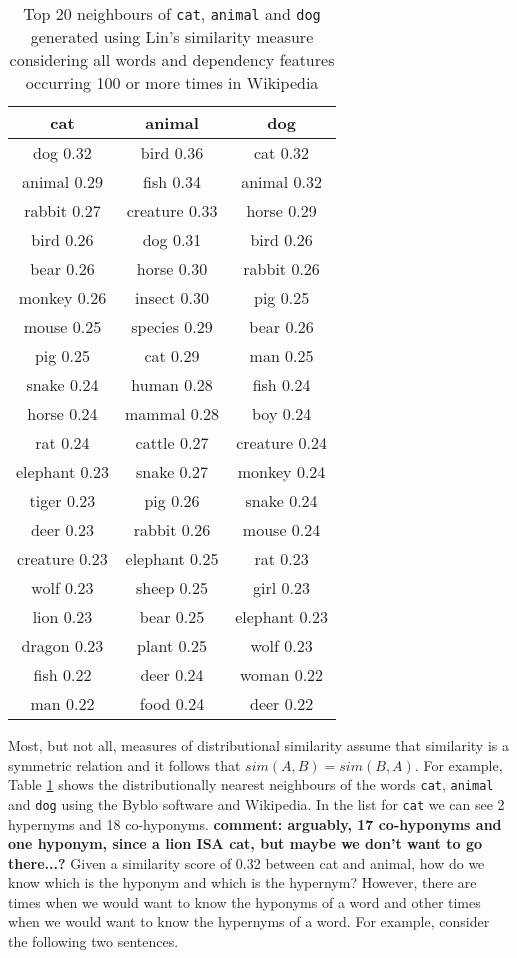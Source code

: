 \documentclass[11pt]{article}
\begin{document}
\begin{table}[ht]
\begin{tabular}{|c|c|c|}
\hline
cat&animal&dog\\
\hline
dog 0.32&bird 0.36&cat 0.32\\
animal 0.29&fish 0.34&animal 0.32\\
rabbit 0.27&creature 0.33&horse 0.29\\
bird 0.26&dog 0.31&bird 0.26\\
bear 0.26&horse 0.30&rabbit 0.26\\
monkey 0.26&insect 0.30&pig 0.25\\
mouse 0.25&species 0.29&bear 0.26\\
pig 0.25&cat 0.29&man 0.25\\
snake 0.24&human 0.28&fish 0.24\\
horse 0.24&mammal 0.28&boy 0.24\\
rat 0.24&cattle 0.27&creature 0.24\\
elephant 0.23&snake 0.27&monkey 0.24\\
tiger 0.23&pig 0.26&snake 0.24\\
deer 0.23&rabbit 0.26&mouse 0.24\\
creature 0.23&elephant 0.25&rat 0.23\\
wolf 0.23&sheep 0.25&girl 0.23\\
lion 0.23&bear 0.25&elephant 0.23\\
dragon 0.23&plant 0.25&wolf 0.23\\
fish 0.22&deer 0.24&woman 0.22\\
man 0.22&food 0.24&deer 0.22\\
\hline
\end{tabular}
\label{table:neighbours}
\caption{Top 20 neighbours of \texttt{cat}, \texttt{animal} and \texttt{dog} generated using Lin's similarity measure \cite{Lin1998} considering all words and dependency features occurring 100 or more times in Wikipedia}
\end{table}
Most, but not all, measures of distributional similarity assume that similarity is a symmetric relation and it follows that $sim(A,B) = sim(B,A)$.  For example, Table \ref{table:neighbours} shows the distributionally nearest neighbours of the words \texttt{cat}, \texttt{animal} and \texttt{dog} using the Byblo software and Wikipedia.  In the list for \texttt{cat} we can see 2 hypernyms and 18 co-hyponyms. {\bf comment: arguably, 17 co-hyponyms and one hyponym, since a lion ISA cat, but maybe we don't want to go there...?}  Given a similarity score of 0.32 between cat and animal, how do we know which is the hyponym and which is the hypernym? However, there are times when we would want to know the hyponyms of a word and other times when we would want to know the hypernyms of a word.  For example, consider the following two sentences.
\end{document}
